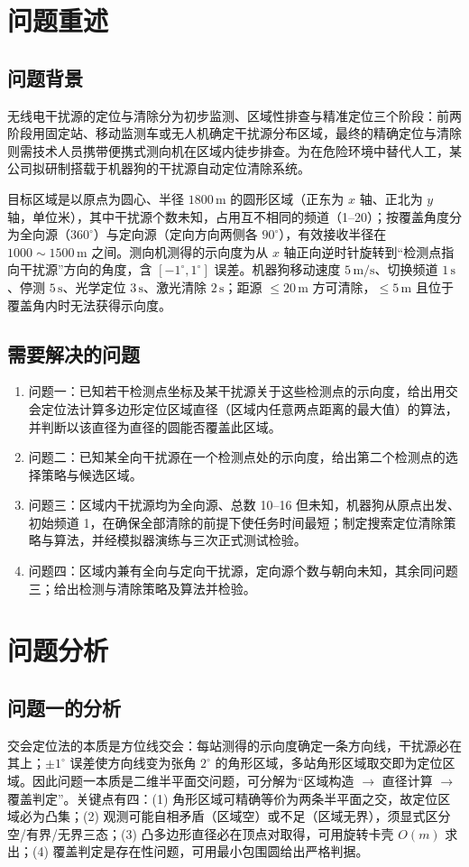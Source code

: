 \documentclass[12pt,a4paper]{article}
\begin{document}
\section{问题重述}
\subsection{问题背景}
无线电干扰源的定位与清除分为初步监测、区域性排查与精准定位三个阶段：前两阶段用固定站、移动监测车或无人机确定干扰源分布区域，最终的精确定位与清除则需技术人员携带便携式测向机在区域内徒步排查。为在危险环境中替代人工，某公司拟研制搭载于机器狗的干扰源自动定位清除系统。

目标区域是以原点为圆心、半径 $1800\,\mathrm{m}$ 的圆形区域（正东为 $x$ 轴、正北为 $y$ 轴，单位米），其中干扰源个数未知，占用互不相同的频道（1--20）；按覆盖角度分为全向源（$360^{\circ}$）与定向源（定向方向两侧各 $90^{\circ}$），有效接收半径在 $1000\sim 1500\,\mathrm{m}$ 之间。测向机测得的示向度为从 $x$ 轴正向逆时针旋转到“检测点指向干扰源”方向的角度，含 $[-1^{\circ},1^{\circ}]$ 误差。机器狗移动速度 $5\,\mathrm{m/s}$、切换频道 $1\,\mathrm{s}$、停测 $5\,\mathrm{s}$、光学定位 $3\,\mathrm{s}$、激光清除 $2\,\mathrm{s}$；距源 $\le 20\,\mathrm{m}$ 方可清除，$\le 5\,\mathrm{m}$ 且位于覆盖角内时无法获得示向度。

\subsection{需要解决的问题}
\begin{enumerate}
\item 问题一：已知若干检测点坐标及某干扰源关于这些检测点的示向度，给出用交会定位法计算多边形定位区域直径（区域内任意两点距离的最大值）的算法，并判断以该直径为直径的圆能否覆盖此区域。
\item 问题二：已知某全向干扰源在一个检测点处的示向度，给出第二个检测点的选择策略与候选区域。
\item 问题三：区域内干扰源均为全向源、总数 10--16 但未知，机器狗从原点出发、初始频道 1，在确保全部清除的前提下使任务时间最短；制定搜索定位清除策略与算法，并经模拟器演练与三次正式测试检验。
\item 问题四：区域内兼有全向与定向干扰源，定向源个数与朝向未知，其余同问题三；给出检测与清除策略及算法并检验。
\end{enumerate}

\section{问题分析}
\subsection{问题一的分析}
交会定位法的本质是方位线交会：每站测得的示向度确定一条方向线，干扰源必在其上；$\pm 1^{\circ}$ 误差使方向线变为张角 $2^{\circ}$ 的角形区域，多站角形区域取交即为定位区域。因此问题一本质是二维半平面交问题，可分解为“区域构造 $\to$ 直径计算 $\to$ 覆盖判定”。关键点有四：(1) 角形区域可精确等价为两条半平面之交，故定位区域必为凸集；(2) 观测可能自相矛盾（区域空）或不足（区域无界），须显式区分空/有界/无界三态；(3) 凸多边形直径必在顶点对取得，可用旋转卡壳 $O(m)$ 求出；(4) 覆盖判定是存在性问题，可用最小包围圆给出严格判据。
\end{document}
